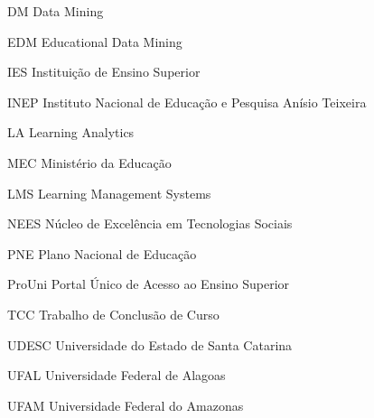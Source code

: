 
\listoffigures*
\cleardoublepage



\listoftables*
\cleardoublepage

\begin{siglas}
    \item[DM]      Data Mining
    \item[EDM]     Educational Data Mining
	\item[IES]     Instituição de Ensino Superior
    \item[INEP]    Instituto Nacional de Educação e Pesquisa Anísio Teixeira
    \item[LA]      Learning Analytics
    \item[MEC]     Ministério da Educação
    \item[LMS]     Learning Management Systems
	\item[NEES]    Núcleo de Excelência em Tecnologias Sociais
    \item[PNE]     Plano Nacional de Educação
    \item[ProUni]  Portal Único de Acesso ao Ensino Superior 
	\item[TCC]     Trabalho de Conclusão de Curso
	\item[UDESC]   Universidade do Estado de Santa Catarina
    \item[UFAL]    Universidade Federal de Alagoas
    \item[UFAM]    Universidade Federal do Amazonas
\end{siglas}




